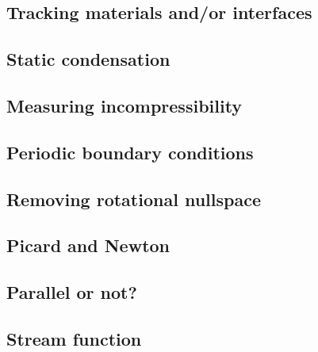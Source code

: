\subsection{Tracking materials and/or interfaces}  %
\newpage %
\subsection{Static condensation}  %
\newpage %
\subsection{Measuring incompressibility \label{ss_incomp}}  %
\newpage %
\subsection{Periodic boundary conditions\label{ss_periodic}} %
\newpage %
\subsection{Removing rotational nullspace\label{ss_nullspace}}  %
\newpage %
\subsection{Picard and Newton \label{ss_nonlinear}}  %
\newpage %
\subsection{Parallel or not?} \label{sec:parallel}  %
\newpage %
\subsection{Stream function} \label{sec:streamfunction}  %
\newpage %
